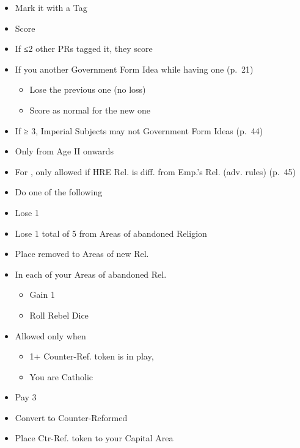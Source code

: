 \documentclass[10pt]{article}
\begin{document}
\begin{itemize}
	\item Mark it with a Tag
	\item Score 
	\item If ≤2 other PRs tagged it, they score 
	\item If you  another Government Form Idea while having one (p.~21)
	\begin{itemize}
			\item Lose the previous one (no \prestige loss)
			\item Score \prestige as normal for the new one
	\end{itemize}
	\item If \authority ≥ 3, Imperial Subjects may not  Government Form Ideas (p.~44)
\end{itemize}

\begin{itemize}
	\item Only from Age II onwards
	\item For , only allowed if HRE Rel. is diff. from Emp.'s Rel. (adv. rules) (p.~45)
	\item Do one of the following
\end{itemize}
\begin{itemize}
	\item Lose   1\stability
	\item Lose 1 \marriage {} total of 5 \influence from Areas of abandoned Religion
	\item Place removed \influence to Areas of new Rel.
	\item In each of your Areas of abandoned Rel.
	\begin{itemize}
		\item Gain 1 \unrest
		\item Roll Rebel Dice
	\end{itemize}
\end{itemize}
\begin{itemize}
	\item Allowed only when
	\begin{itemize}
		\item 1+ Counter-Ref. token is in play, 
		\item You are Catholic
	\end{itemize}
	\item Pay 3\adminpower
	\item Convert to Counter-Reformed
	\item Place Ctr-Ref. token to your Capital Area
\end{itemize}
\end{document}
